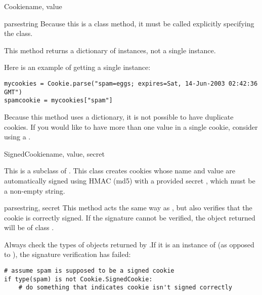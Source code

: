\begin{classdesc}{Cookie}{name, value}
\begin{methoddesc}[Cookie]{parse}{string}
    Because this is a class method, it must be called explicitly
    specifying the class.

    This method returns a dictionary of  instances, not
    a single  instance.

    Here is an example of getting a single  instance:
    \begin{verbatim}
mycookies = Cookie.parse("spam=eggs; expires=Sat, 14-Jun-2003 02:42:36 GMT")
spamcookie = mycookies["spam"]
    \end{verbatim}

    \begin{notice}
      Because this method uses a dictionary, it is not possible to
      have duplicate cookies. If you would like to have more than one
      value in a single cookie, consider using a .
    \end{notice}

  \end{methoddesc}

\end{classdesc}

\begin{classdesc}{SignedCookie}{name, value, secret}

  This is a subclass of . This class creates cookies
  whose name and value are automatically signed using HMAC (md5) with
  a provided secret , which must be a non-empty string.

  \begin{methoddesc}[SignedCookie]{parse}{string, secret}
    This method acts the same way as , but also
    verifies that the cookie is correctly signed. If the signature
    cannot be verified, the object returned will be of class
    .

    \begin{notice}
      Always check the types of objects returned by
      .If it is an instance of
       (as opposed to ), the
      signature verification has failed:
      \begin{verbatim}
# assume spam is supposed to be a signed cookie
if type(spam) is not Cookie.SignedCookie:
    # do something that indicates cookie isn't signed correctly
      \end{verbatim}
    \end{notice}
  \end{methoddesc}

\end{classdesc}

